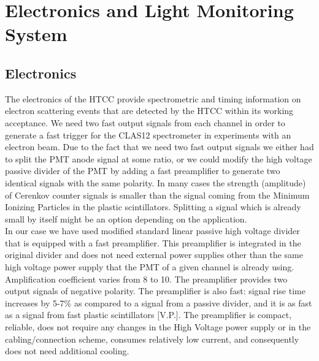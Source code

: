 \section{Electronics and Light Monitoring System}
\subsection{Electronics}

\indent The electronics of the HTCC provide spectrometric and timing information on electron scattering events that are detected by the HTCC within its working acceptance. We need two fast output signals from each channel in order to generate a fast trigger for the CLAS12 spectrometer in experiments with an electron beam. Due to the fact that we need two fast output signals we either had to split the PMT anode signal at some ratio, or we could modify the high voltage passive divider of the PMT by adding a fast preamplifier to generate two identical signals with the same polarity. In many cases the strength (amplitude) of Cerenkov counter signals is smaller than the signal coming from the Minimum Ionizing Particles in the plastic scintillators. Splitting a signal which is already small by itself might be an option depending on the application. \\
\indent In our case we have used modified standard linear passive high voltage divider that is equipped with a fast preamplifier. This preamplifier is integrated in the original divider and does not need external power supplies other than the same high voltage power supply that the PMT of a given channel is already using. Amplification coefficient varies from 8 to 10. The preamplifier provides two output signals of negative polarity. The preamplifier is also fast: signal rise time increases by 5-7\% as compared to a signal from a passive divider, and it is as fast as a signal from fast plastic scintillators [V.P.]. The preamplifier is compact, reliable, does not require any changes in the High Voltage power supply or in the cabling/connection scheme, consumes relatively low current, and consequently does not need additional cooling. \\
